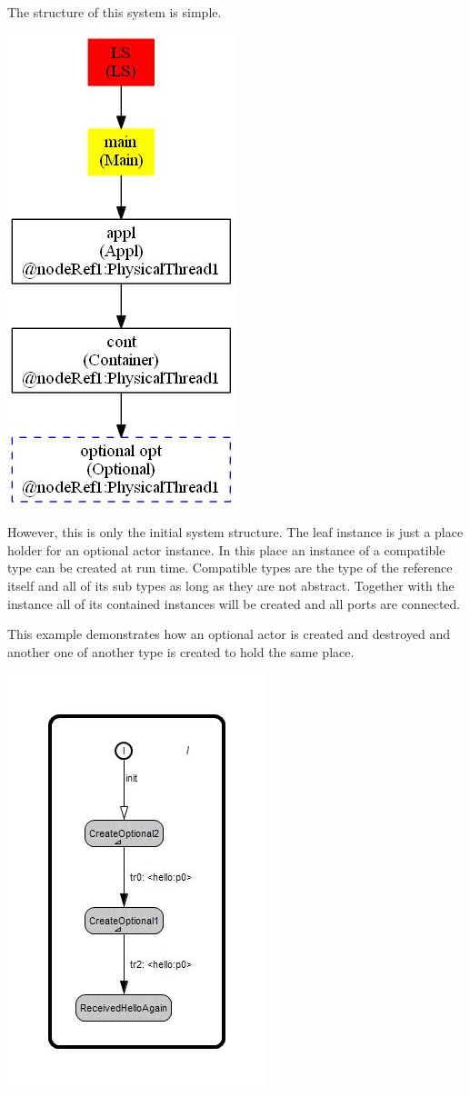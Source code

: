 The structure of this system is simple.

\includegraphics[scale=0.7]{images/039-DynAct1-Main_instanceTree.jpg}

However, this is only the initial system structure.
The leaf instance is just a place holder for an optional actor instance.
In this place an instance of a compatible type can be created at run time.
Compatible types are the type of the reference itself and all of its sub types as long as they are not abstract.
Together with the instance all of its contained instances will be created and all ports are connected.

This example demonstrates how an optional actor is created and destroyed and another one of another type
is created to hold the same place.

\includegraphics[scale=0.7]{images/039-DynAct1-Container_behavior.jpg}

